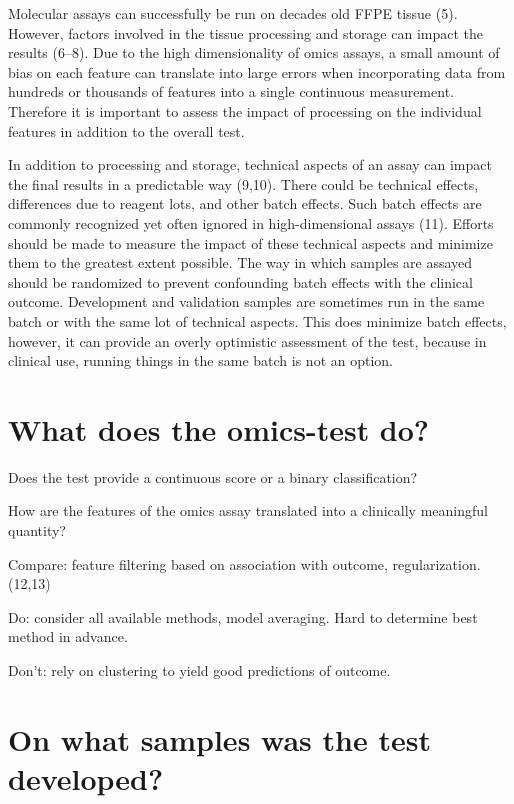 \documentclass[11pt]{article}
\begin{document}
Molecular assays can successfully be run on decades old FFPE tissue (5).
However, factors involved in the tissue processing and storage can
impact the results (6--8). Due to the high dimensionality of omics
assays, a small amount of bias on each feature can translate into large
errors when incorporating data from hundreds or thousands of features
into a single continuous measurement. Therefore it is important to
assess the impact of processing on the individual features in addition
to the overall test.

In addition to processing and storage, technical aspects of an assay can
impact the final results in a predictable way (9,10). There could be
technical effects, differences due to reagent lots, and other batch
effects. Such batch effects are commonly recognized yet often ignored in
high-dimensional assays (11). Efforts should be made to measure the
impact of these technical aspects and minimize them to the greatest
extent possible. The way in which samples are assayed should be
randomized to prevent confounding batch effects with the clinical
outcome. Development and validation samples are sometimes run in the
same batch or with the same lot of technical aspects. This does minimize
batch effects, however, it can provide an overly optimistic assessment
of the test, because in clinical use, running things in the same batch
is not an option.

\section{What does the omics-test
do?}\label{what-does-the-omics-test-do}

Does the test provide a continuous score or a binary classification?

How are the features of the omics assay translated into a clinically
meaningful quantity?

Compare: feature filtering based on association with outcome,
regularization. (12,13)

Do: consider all available methods, model averaging. Hard to determine
best method in advance.

Don't: rely on clustering to yield good predictions of outcome.

\section{On what samples was the test
developed?}\label{on-what-samples-was-the-test-developed}
\end{document}
